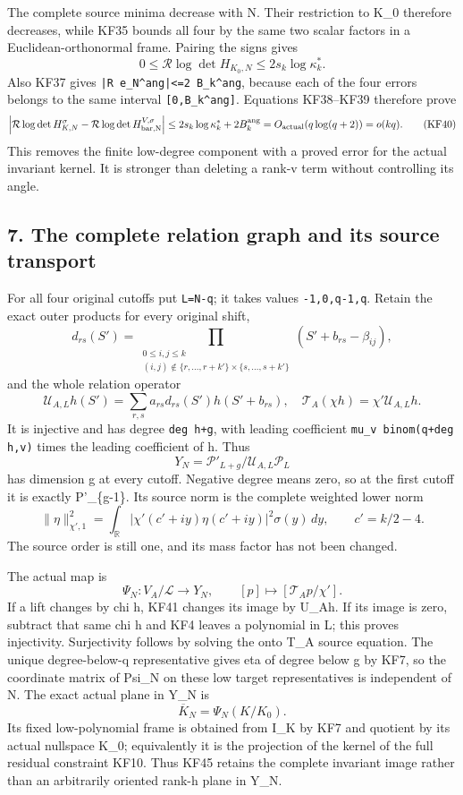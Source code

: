 \documentclass[11pt]{article}
\begin{document}
The complete source minima decrease with N. Their restriction to K\_0 therefore decreases, while KF35 bounds all four by the same two scalar factors in a Euclidean-orthonormal frame. Pairing the signs gives \[
0\le\mathcal R\log\det H_{K_0,N}
\le2s_k\log\kappa_k^*.
\tag{KF39}
\] Also KF37 gives \nolinkurl{|R e_N^ang|<=2 B_k^ang}, because each of the four errors belongs to the same interval \texttt{{[}0,B\_k\^{}ang{]}}. Equations KF38--KF39 therefore prove \[
\left|\mathcal R\log\det H_{K,N}^{\sigma}
-\mathcal R\log\det H_{\rm bar,N}^{V,\sigma}\right|
\le2s_k\log\kappa_k^*+2B_k^{\rm ang}
=O_{\rm actual}(q\log(q+2))=o(kq).
\tag{KF40}
\] This removes the finite low-degree component with a proved error for the actual invariant kernel. It is stronger than deleting a rank-v term without controlling its angle.

\subsection{7. The complete relation graph and its source transport}\label{the-complete-relation-graph-and-its-source-transport}

For all four original cutoffs put \texttt{L=N-q}; it takes values \texttt{-1,0,q-1,q}. Retain the exact outer products for every original shift, \[
d_{rs}(S')=\prod_{\substack{0\le i,j\le k\\
(i,j)\notin\{r,\ldots,r+k'\}\times\{s,\ldots,s+k'\}}}
(S'+b_{rs}-\beta_{ij}),
\] and the whole relation operator \[
\mathcal U_{A,L}h(S')=\sum_{r,s}a_{rs}d_{rs}(S')h(S'+b_{rs}),
\quad \mathcal T_A(\chi h)=\chi'\mathcal U_{A,L}h.
\tag{KF41}
\] It is injective and has degree \texttt{deg\ h+g}, with leading coefficient \nolinkurl{mu_v binom(q+deg h,v)} times the leading coefficient of h. Thus \[
Y_N=\mathcal P'_{L+g}/\mathcal U_{A,L}\mathcal P_L
\tag{KF42}
\] has dimension g at every cutoff. Negative degree means zero, so at the first cutoff it is exactly P'\_\{g-1\}. Its source norm is the complete weighted lower norm \[
\|\eta\|_{\chi',1}^2=
\int_{\mathbb R}|\chi'(c'+iy)\eta(c'+iy)|^2\sigma(y)\,dy,
\qquad c'=k/2-4.
\tag{KF43}
\] The source order is still one, and its mass factor has not been changed.

The actual map is \[
\Psi_N:V_A/\mathcal L\longrightarrow Y_N,
\qquad [p]\longmapsto[\mathcal T_Ap/\chi'].
\tag{KF44}
\] If a lift changes by chi h, KF41 changes its image by U\_Ah. If its image is zero, subtract that same chi h and KF4 leaves a polynomial in L; this proves injectivity. Surjectivity follows by solving the onto T\_A source equation. The unique degree-below-q representative gives eta of degree below g by KF7, so the coordinate matrix of Psi\_N on these low target representatives is independent of N. The exact actual plane in Y\_N is \[
\overline K_N=\Psi_N(K/ K_0).
\tag{KF45}
\] Its fixed low-polynomial frame is obtained from I\_K by KF7 and quotient by its actual nullspace K\_0; equivalently it is the projection of the kernel of the full residual constraint KF10. Thus KF45 retains the complete invariant image rather than an arbitrarily oriented rank-h plane in Y\_N.
\end{document}

